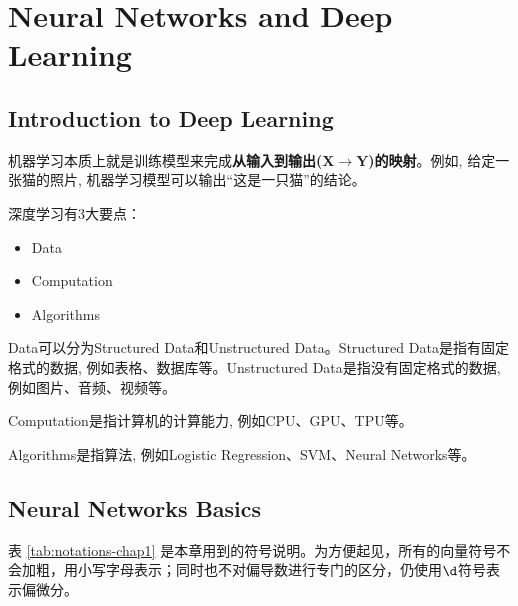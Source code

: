 \chapter{Neural Networks and Deep Learning}

\section{Introduction to Deep Learning}
机器学习本质上就是训练模型来完成\textbf{从输入到输出($\bm{X\to Y}$)的映射}。例如, 给定一张猫的照片, 机器学习模型可以输出``这是一只猫''的结论。

深度学习有3大要点：
\begin{itemize}	
    \item Data
    \item Computation
    \item Algorithms
\end{itemize}

Data可以分为Structured Data和Unstructured Data。Structured Data是指有固定格式的数据, 例如表格、数据库等。Unstructured Data是指没有固定格式的数据, 例如图片、音频、视频等。

Computation是指计算机的计算能力, 例如CPU、GPU、TPU等。

Algorithms是指算法, 例如Logistic Regression、SVM、Neural Networks等。

\section{Neural Networks Basics}

表 \ref{tab:notations-chap1} 是本章用到的符号说明。为方便起见，所有的向量符号不会加粗，用小写字母表示；同时也不对偏导数进行专门的区分，仍使用$\d $符号表示偏微分。

